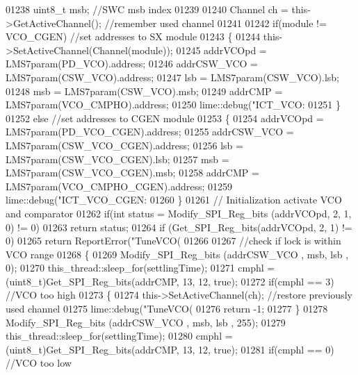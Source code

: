 \begin{DoxyCode}
{{{{{{{{{{{{{{{{{{{{{{{{{{{{{{{{{01238     uint8\_t msb; \textcolor{comment}{//SWC msb index}
01239 
01240     Channel ch = this->GetActiveChannel(); \textcolor{comment}{//remember used channel}
01241 
01242     \textcolor{keywordflow}{if}(module != VCO_CGEN) \textcolor{comment}{//set addresses to SX module}
01243     \{
01244         this->SetActiveChannel(Channel(module));
01245         addrVCOpd = LMS7param(PD_VCO).address;
01246         addrCSW\_VCO = LMS7param(CSW_VCO).address;
01247         lsb = LMS7param(CSW_VCO).lsb;
01248         msb = LMS7param(CSW_VCO).msb;
01249         addrCMP = LMS7param(VCO_CMPHO).address;
01250         lime::debug(\textcolor{stringliteral}{"ICT\_VCO: %
01251     \}
01252     \textcolor{keywordflow}{else} \textcolor{comment}{//set addresses to CGEN module}
01253     \{
01254         addrVCOpd = LMS7param(PD_VCO_CGEN).address;
01255         addrCSW\_VCO = LMS7param(CSW_VCO_CGEN).address;
01256         lsb = LMS7param(CSW_VCO_CGEN).lsb;
01257         msb = LMS7param(CSW_VCO_CGEN).msb;
01258         addrCMP = LMS7param(VCO_CMPHO_CGEN).address;
01259         lime::debug(\textcolor{stringliteral}{"ICT\_VCO\_CGEN: %
01260     \}
01261     \textcolor{comment}{// Initialization activate VCO and comparator}
01262     \textcolor{keywordflow}{if}(\textcolor{keywordtype}{int} status = Modify_SPI_Reg_bits (addrVCOpd, 2, 1, 0) != 0)
01263         \textcolor{keywordflow}{return} status;
01264     \textcolor{keywordflow}{if} (Get_SPI_Reg_bits(addrVCOpd, 2, 1) != 0)
01265         \textcolor{keywordflow}{return} ReportError(\textcolor{stringliteral}{"TuneVCO(%
01266 
01267     \textcolor{comment}{//check if lock is within VCO range}
01268     \{
01269         Modify_SPI_Reg_bits (addrCSW\_VCO , msb, lsb , 0);
01270         this\_thread::sleep\_for(settlingTime);
01271         cmphl = (uint8\_t)Get_SPI_Reg_bits(addrCMP, 13, 12, \textcolor{keyword}{true});
01272         \textcolor{keywordflow}{if}(cmphl == 3) \textcolor{comment}{//VCO too high}
01273         \{
01274             this->SetActiveChannel(ch); \textcolor{comment}{//restore previously used channel}
01275             lime::debug(\textcolor{stringliteral}{"TuneVCO(%
01276             \textcolor{keywordflow}{return} -1;
01277         \}
01278         Modify_SPI_Reg_bits (addrCSW\_VCO , msb, lsb , 255);
01279         this\_thread::sleep\_for(settlingTime);
01280         cmphl = (uint8\_t)Get_SPI_Reg_bits(addrCMP, 13, 12, \textcolor{keyword}{true});
01281         \textcolor{keywordflow}{if}(cmphl == 0) \textcolor{comment}{//VCO too low}
}}}}}}}}}}}}}}}}}}}}}}}}}}}}}}}}}}}}}
\end{DoxyCode}
